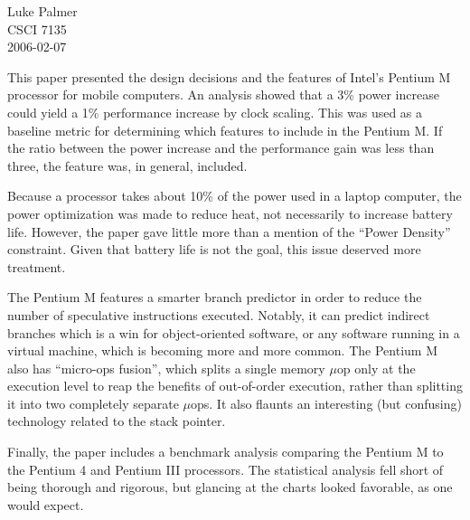 \documentclass[12pt]{article}
\begin{document}
\noindent
Luke Palmer \\
CSCI 7135 \\
2006-02-07

This paper presented the design decisions and the features of Intel's
Pentium M processor for mobile computers.  An analysis showed that a 3\%
power increase could yield a 1\% performance increase by clock scaling.
This was used as a baseline metric for determining which features to
include in the Pentium M.  If the ratio between the power increase
and the performance gain was less than three, the feature was, in
general, included.

Because a processor takes about 10\% of the power used in a laptop
computer, the power optimization was made to reduce heat, not
necessarily to increase battery life.  However, the paper gave little
more than a mention of the ``Power Density'' constraint.  Given that
battery life is not the goal, this issue deserved more treatment.

The Pentium M features a smarter branch predictor in order to reduce the
number of speculative instructions executed.   Notably, it can predict
indirect branches which is a win for object-oriented software, or any
software running in a virtual machine, which is becoming more and more
common.  The Pentium M also has ``micro-ops fusion'', which splits a
single memory $\mu$op only at the execution level to reap the benefits
of out-of-order execution, rather than splitting it into two completely
separate $\mu$ops.  It also flaunts an interesting (but confusing)
technology related to the stack pointer.

Finally, the paper includes a benchmark analysis comparing the Pentium M
to the Pentium 4 and Pentium III processors.   The statistical analysis
fell short of being thorough and rigorous, but glancing at the charts
looked favorable, as one would expect.
\end{document}
